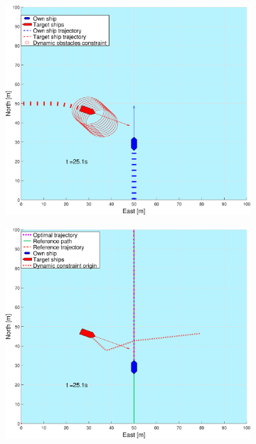 \begin{figure}[ht!]
\begin{subfigure}[b]{0.499\textwidth}
        \subcaption{}
    \end{subfigure}
    \hfill
    \\
    \begin{subfigure}[b]{0.49\textwidth}
        \centering
        \includegraphics[width=\textwidth]{Images/Figures/enkel_SO/_Simple_0fig1_time=25}
        \subcaption{}
    \end{subfigure}
    \hfill
    \begin{subfigure}[b]{0.499\textwidth}
        \centering
        \includegraphics[width=\textwidth]{Images/Figures/enkel_SO/_Simple_0fig999_time=25}

\end{subfigure}
\end{figure}
